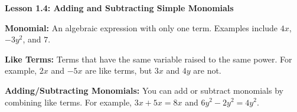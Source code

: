 \begin{center}
\textbf{Lesson 1.4: Adding and Subtracting Simple Monomials}
\end{center}



    \textbf{Monomial:} An algebraic expression with only one term. Examples include \( 4x \), \( -3y^2 \), and \( 7 \).
    
    \textbf{Like Terms:} Terms that have the same variable raised to the same power. For example, \( 2x \) and \( -5x \) are like terms, but \( 3x \) and \( 4y \) are not.
  
    \textbf{Adding/Subtracting Monomials:} You can add or subtract monomials by combining like terms. For example, \( 3x + 5x = 8x \) and \( 6y^2 - 2y^2 = 4y^2 \).

 

 
